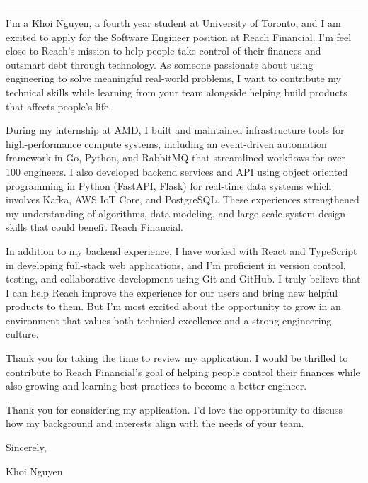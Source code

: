 \documentclass[
	12pt, %
]{resume} %
\begin{document}
    \medskip
    \hrule %
    \medskip  

I'm a Khoi Nguyen, a fourth year student at University of Toronto, and I am excited to apply for the Software Engineer position at Reach Financial. I'm feel close to Reach's mission to help people take control of their finances and outsmart debt through technology. As someone passionate about using engineering to solve meaningful real-world problems, I want to contribute my technical skills while learning from your team alongside helping build products that affects people's life.

During my internship at AMD, I built and maintained infrastructure tools for high-performance compute systems, including an event-driven automation framework in Go, Python, and RabbitMQ that streamlined workflows for over 100 engineers. I also developed backend services and API using object oriented programming in Python (FastAPI, Flask) for real-time data systems which involves Kafka, AWS IoT Core, and PostgreSQL. These experiences strengthened my understanding of algorithms, data modeling, and large-scale system design-skills that could benefit Reach Financial.

In addition to my backend experience, I have worked with React and TypeScript in developing full-stack web applications, and I'm proficient in version control, testing, and collaborative development using Git and GitHub. I truly believe that I can help Reach improve the experience for our users and bring new helpful products to them. But I'm most excited about the opportunity to grow in an environment that values both technical excellence and a strong engineering culture.

Thank you for taking the time to review my application. I would be thrilled to contribute to Reach Financial's goal of helping people control their finances while also growing and learning best practices to become a better engineer.

Thank you for considering my application. I'd love the opportunity to discuss how my background and interests align with the needs of your team.

Sincerely,

Khoi Nguyen
\end{document}
